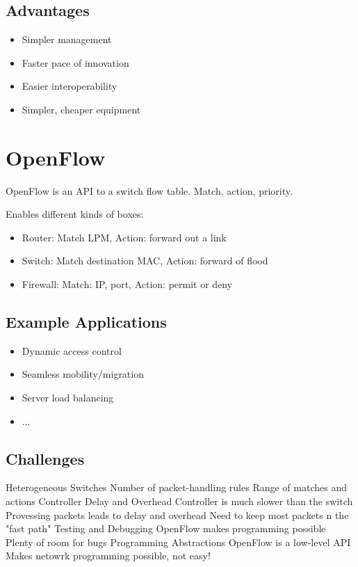 \documentclass[a4paper, fontsize=8pt, landscape, DIV=1]{scrartcl}
\begin{document}
\begin{multicols*}{4}
  \subsection{Advantages}
  \begin{itemize}
    \item Simpler management
    \item Faster pace of innovation
    \item Easier interoperability
    \item Simpler, cheaper equipment
  \end{itemize}

  \section{OpenFlow}
  OpenFlow is an API to a switch flow table. Match, action, priority.

  Enables different kinds of boxes:
  \begin{itemize}
    \item Router: Match LPM, Action: forward out a link
    \item Switch: Match destination MAC, Action: forward of flood
    \item Firewall: Match: IP, port, Action: permit or deny
  \end{itemize}

  \subsection{Example Applications}
  \begin{itemize}
    \item Dynamic access control
    \item Seamless mobility/migration
    \item Server load balancing
    \item ...
  \end{itemize}

  \subsection{Challenges}
  \begin{outline}
    \1 Heterogeneous Switches
      \2 Number of packet-handling rules
      \2 Range of matches and actions
    \1 Controller Delay and Overhead
      \2 Controller is much slower than the switch
      \2 Provessing packets leads to delay and overhead
      \2 Need to keep most packets n the "fast path"
    \1 Testing and Debugging
      \2 OpenFlow makes programming possible
      \2 Plenty of room for bugs
    \1 Programming Abstractions
      \2 OpenFlow is a low-level API
      \2 Makes netowrk programming possible, not easy!
  \end{outline}


\end{multicols*}
\end{document}
